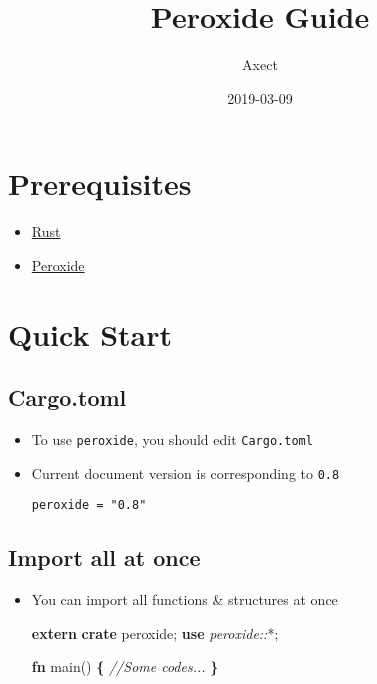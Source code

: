 \documentclass[]{book}
\title{Peroxide Guide}
\author{Axect}
\date{2019-03-09}
\newenvironment{Shaded}{\begin{snugshade}}{\end{snugshade}}
\newcommand{\CommentTok}[1]{\textcolor[rgb]{0.56,0.35,0.01}{\textit{#1}}}
\newcommand{\KeywordTok}[1]{\textcolor[rgb]{0.13,0.29,0.53}{\textbf{#1}}}
\newcommand{\NormalTok}[1]{#1}
\newcommand{\OperatorTok}[1]{\textcolor[rgb]{0.81,0.36,0.00}{\textbf{#1}}}
\newcommand{\PreprocessorTok}[1]{\textcolor[rgb]{0.56,0.35,0.01}{\textit{#1}}}
\providecommand{\tightlist}{%
  \setlength{\itemsep}{0pt}\setlength{\parskip}{0pt}}
\begin{document}
\maketitle

{
\setcounter{tocdepth}{1}
\tableofcontents
}
\hypertarget{prerequisites}{%
\chapter{Prerequisites}\label{prerequisites}}

\begin{itemize}
\tightlist
\item
  \href{https://www.rust-lang.org/tools/install}{Rust}
\item
  \href{https://crates.io/crates/peroxide}{Peroxide}
\end{itemize}

\hypertarget{quick}{%
\chapter{Quick Start}\label{quick}}

\hypertarget{cargo.toml}{%
\section{Cargo.toml}\label{cargo.toml}}

\begin{itemize}
\item
  To use \texttt{peroxide}, you should edit \texttt{Cargo.toml}
\item
  Current document version is corresponding to \texttt{0.8}

\begin{verbatim}
peroxide = "0.8"
\end{verbatim}
\end{itemize}

\hypertarget{import-all-at-once}{%
\section{Import all at once}\label{import-all-at-once}}

\begin{itemize}
\item
  You can import all functions \& structures at once

\begin{Shaded}
\begin{Highlighting}[]
\KeywordTok{extern} \KeywordTok{crate}\NormalTok{ peroxide;}
\KeywordTok{use} \PreprocessorTok{peroxide::}\NormalTok{*;}

\KeywordTok{fn}\NormalTok{ main() }\OperatorTok{\{}
    \CommentTok{//Some codes...}
\OperatorTok{\}}
\end{Highlighting}
\end{Shaded}
\end{itemize}
\end{document}
